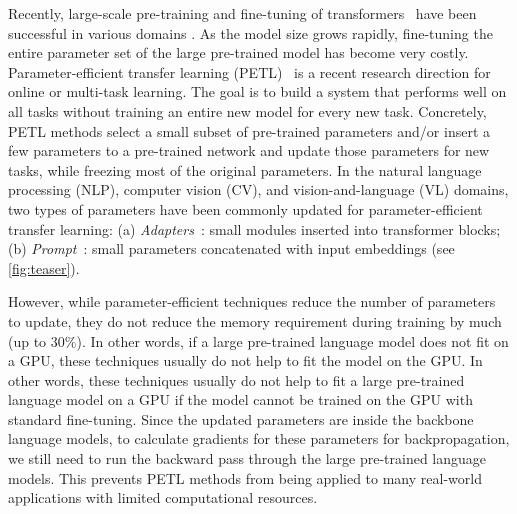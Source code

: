 Recently, large-scale pre-training and fine-tuning of transformers~\cite{vaswani2017attention} have been successful in various domains \cite{Devlin2019BERTPO,liu2019roberta,raffel2020exploring,Lu2019ViLBERTPT,Tan2019LXMERTLC,cho2021unifying,he2021masked,bao2021beit,dosovitskiy2021an}. As the model size grows rapidly, fine-tuning the entire parameter set of the large pre-trained model has become very costly. Parameter-efficient transfer learning (PETL)~\cite{Lester2021ThePO,houlsby2019parameter,mahabadi2021parameter,mahabadi2021compacter,li2021prefix,sung2021training,zaken2021bitfit,guo2021parameter,hu2021lora,he2022towards,mao2021unipelt,Zhang2021TipAdapterTC,Gao2021CLIPAdapterBV,Sung2021VLAdapterPT, Zhang2019SideTuningNA} is a recent research direction for online or multi-task learning. The goal is to build a system that performs well on all tasks without training an entire new model for every new task. Concretely, PETL methods select a small subset of pre-trained parameters and/or insert a few parameters to a pre-trained network and update those parameters for new tasks, while freezing most of the original parameters. In the natural language processing (NLP), computer vision (CV), and vision-and-language (VL) domains, two types of parameters have been commonly updated for parameter-efficient transfer learning: (a) \textit{Adapters}~\cite{houlsby2019parameter,mahabadi2021compacter,mahabadi2021parameter}: small modules inserted into transformer blocks; (b) \textit{Prompt}~\cite{li2021prefix,Lester2021ThePO}: small parameters concatenated with input embeddings (see \ref{fig:teaser}).

However, while parameter-efficient techniques reduce the number of parameters to update, they do not reduce the memory requirement during training by much (up to $30\%$).
In other words, if a large pre-trained language model does not fit on a GPU, these techniques usually do not help to fit the model on the GPU.  In other words, these techniques usually do not help to fit a large pre-trained language model on a GPU if the model cannot be trained on the GPU with standard fine-tuning. Since the updated parameters are inside the backbone language models, to calculate gradients for these parameters for backpropagation, we still need to run the backward pass through the large pre-trained language models. This prevents PETL methods from being applied to many real-world applications with limited computational resources.

